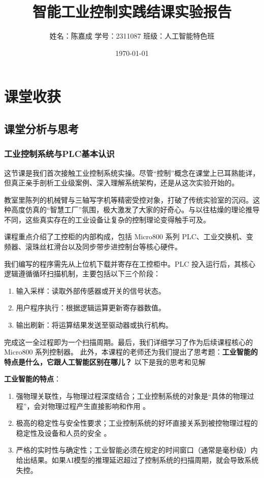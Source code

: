 \documentclass{article}
\title{智能工业控制实践结课实验报告}
\author{姓名：陈嘉成 \qquad 学号：2311087 \qquad 班级：人工智能特色班}
\date{\today}
\begin{document}
\maketitle
{}
\tableofcontents
\newpage
{}

\section{课堂收获}

\subsection{课堂分析与思考}
\subsubsection{工业控制系统与PLC基本认识}
这节课是我们首次接触工业控制系统实操。尽管“控制”概念在课堂上已耳熟能详，但真正亲手剖析工业级案例、深入理解系统架构，还是从这次实验开始的。\par
教室里陈列的机械臂与三轴写字机等精密受控对象，打破了传统实验室的沉闷。这种高度仿真的“智慧工厂”氛围，极大激发了大家的好奇心。与以往枯燥的理论推导不同，这些真实存在的工业设备让复杂的控制理论变得触手可及。\par
课程重点介绍了工控柜的内部构成，包括 Micro800 系列 PLC、工业交换机、变频器、滚珠丝杠滑台以及同步带步进控制台等核心硬件。\par
我们编写的程序需先从上位机下载并寄存在工控柜中。PLC 投入运行后，其核心逻辑遵循循环扫描机制，主要包括以下三个阶段：
\begin{enumerate}
\item 输入采样：读取外部传感器或开关的信号状态。
\item 用户程序执行：根据逻辑运算更新寄存器数值。
\item 输出刷新：将运算结果发送至驱动器或执行机构。
\end{enumerate}
完成这一全过程即为一个扫描周期。最后，我们详细学习了作为后续课程核心的 Micro800 系列控制器。
此外，本课程的老师还为我们提出了思考题：\textbf{工业智能的特点是什么，它跟人工智能区别在哪儿？} 以下是我的思考和见解\par
\textbf{工业智能的特点}：\par
\begin{enumerate}
\item 强物理关联性，与物理过程深度结合；工业控制系统的对象是“具体的物理过程”，会对物理过程产生直接影响和作用 。
\item 极高的稳定性与安全性要求；工业控制系统的好坏直接关系到被控物理过程的稳定性及设备和人员的安全 。
\item 严格的实时性与确定性；工业智能必须在规定的时间窗口（通常是毫秒级）内给出结果。如果AI模型的推理延迟超过了控制系统的扫描周期，就会导致系统失控。
\end{enumerate}
\end{document}
